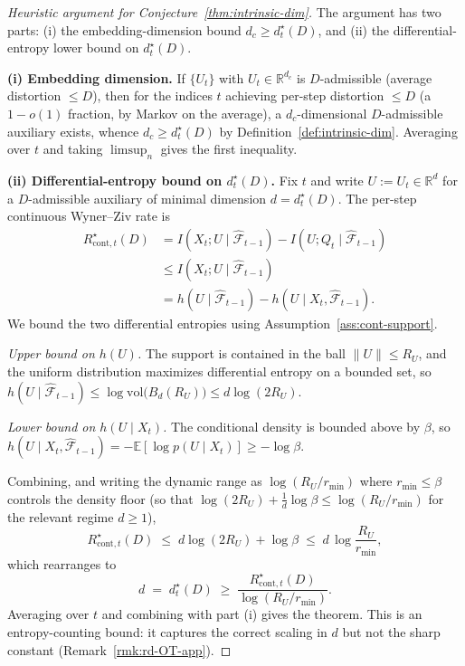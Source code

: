 \documentclass[11pt]{article}
\newcommand{\E}{\mathbb{E}}
\newcommand{\R}{\mathbb{R}}
\newcommand{\F}{\mathcal{F}}
\newcommand{\Fhat}{\hat{\F}}
\theoremstyle{plain}
\theoremstyle{definition}
\theoremstyle{remark}
\begin{document}
\begin{proof}[Heuristic argument for Conjecture~\ref{thm:intrinsic-dim}]
The argument has two parts: (i) the embedding-dimension bound
$d_c \geq d^\star_t(D)$, and (ii) the differential-entropy lower
bound on $d^\star_t(D)$.

\textbf{(i) Embedding dimension.}
If $\{U_t\}$ with $U_t \in \R^{d_c}$ is $D$-admissible (average
distortion $\leq D$), then for the indices $t$ achieving per-step
distortion $\leq D$ (a $1-o(1)$ fraction, by Markov on the
average), a $d_c$-dimensional $D$-admissible auxiliary exists,
whence $d_c \geq d^\star_t(D)$ by
Definition~\ref{def:intrinsic-dim}. Averaging over $t$ and taking
$\limsup_n$ gives the first inequality.

\textbf{(ii) Differential-entropy bound on $d^\star_t(D)$.}
Fix $t$ and write $U := U_t \in \R^{d}$ for a $D$-admissible
auxiliary of minimal dimension $d = d^\star_t(D)$. The per-step
continuous Wyner--Ziv rate is
\begin{align*}
R^{\star}_{\mathrm{cont},t}(D)
&= I(X_t; U \mid \Fhat_{t-1}) - I(U; Q_t \mid \Fhat_{t-1}) \\
&\leq I(X_t; U \mid \Fhat_{t-1}) \\
&= h(U \mid \Fhat_{t-1}) - h(U \mid X_t, \Fhat_{t-1}).
\end{align*}
We bound the two differential entropies using
Assumption~\ref{ass:cont-support}.

\emph{Upper bound on $h(U)$.} The support is contained in the ball
$\|U\| \leq R_U$, and the uniform distribution maximizes
differential entropy on a bounded set, so
$h(U \mid \Fhat_{t-1}) \leq \log \mathrm{vol}\bigl(B_d(R_U)\bigr)
\leq d \log(2 R_U)$.

\emph{Lower bound on $h(U \mid X_t)$.} The conditional density is
bounded above by $\beta$, so
$h(U \mid X_t, \Fhat_{t-1}) = -\E[\log p(U \mid X_t)] \geq -\log
\beta$.

Combining, and writing the dynamic range as
$\log(R_U/r_{\min})$ where $r_{\min} \leq \beta$ controls the
density floor (so that $\log(2R_U) + \tfrac1d \log \beta \leq
\log(R_U/r_{\min})$ for the relevant regime $d \geq 1$),
\[
R^{\star}_{\mathrm{cont},t}(D)
\;\leq\;
d \log(2R_U) + \log\beta
\;\leq\;
d \,\log\!\frac{R_U}{r_{\min}},
\]
which rearranges to
\[
d \;=\; d^\star_t(D)
\;\geq\;
\frac{R^{\star}_{\mathrm{cont},t}(D)}{\log(R_U/r_{\min})}.
\]
Averaging over $t$ and combining with part (i) gives the theorem.
This is an entropy-counting bound: it captures the correct scaling
in $d$ but not the sharp constant
(Remark~\ref{rmk:rd-OT-app}).
\end{proof}
\end{document}
